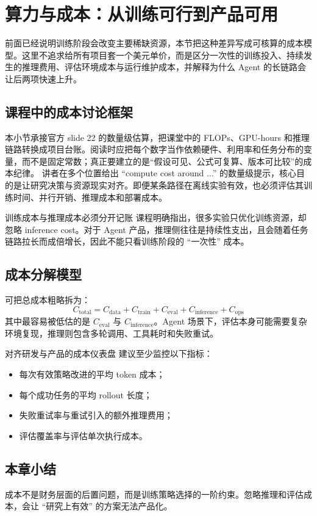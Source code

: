 \section{算力与成本：从训练可行到产品可用}

前面已经说明训练阶段会改变主要稀缺资源，本节把这种差异写成可核算的成本模型。这里不追求给所有项目套一个美元单价，而是区分一次性的训练投入、持续发生的推理费用、评估环境成本与运行维护成本，并解释为什么 Agent 的长链路会让后两项快速上升。

\subsection{课程中的成本讨论框架}
本小节承接官方 slide 22 的数量级估算，把课堂中的 FLOPs、GPU-hours 和推理链路转换成项目台账。阅读时应把每个数字当作依赖硬件、利用率和任务分布的变量，而不是固定常数；真正要建立的是“假设可见、公式可复算、版本可比较”的成本纪律。
讲者在多个位置给出 ``compute cost around ...'' 的数量级提示，核心目的是让研究决策与资源现实对齐。即便某条路径在离线实验有效，也必须评估其训练时间、并行开销、推理成本和部署成本。

\begin{importantbox}{训练成本与推理成本必须分开记账}
课程明确指出，很多实验只优化训练资源，却忽略 inference cost。对于 Agent 产品，推理侧往往是持续性支出，且会随着任务链路拉长而成倍增长，因此不能只看训练阶段的 ``一次性'' 成本。
\end{importantbox}

\subsection{成本分解模型}
可把总成本粗略拆为：
\[
C_{\text{total}} = C_{\text{data}} + C_{\text{train}} + C_{\text{eval}} + C_{\text{inference}} + C_{\text{ops}}
\]
其中最容易被低估的是 $C_{\text{eval}}$ 与 $C_{\text{inference}}$。Agent 场景下，评估本身可能需要复杂环境复现，推理则包含多轮调用、工具耗时和失败重试。

\begin{knowledgebox}{对齐研发与产品的成本仪表盘}
建议至少监控以下指标：
\begin{itemize}
    \item 每次有效策略改进的平均 token 成本；
    \item 每个成功任务的平均 rollout 长度；
    \item 失败重试率与重试引入的额外推理费用；
    \item 评估覆盖率与评估单次执行成本。
\end{itemize}
\end{knowledgebox}

\subsection{本章小结}
成本不是财务层面的后置问题，而是训练策略选择的一阶约束。忽略推理和评估成本，会让 ``研究上有效'' 的方案无法产品化。


